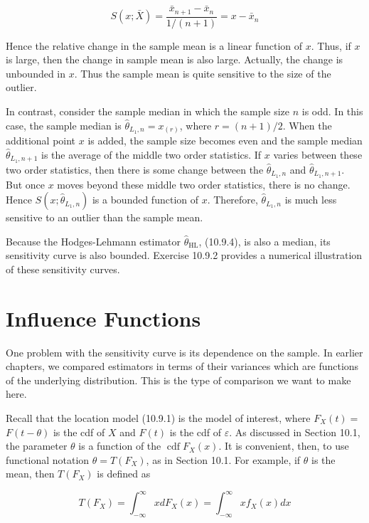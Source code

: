 \begin{equation*}
S(x ; \bar{X})=\frac{\bar{x}_{n+1}-\bar{x}_{n}}{1 /(n+1)}=x-\bar{x}_{n} \tag{10.9.6}
\end{equation*}


Hence the relative change in the sample mean is a linear function of $x$. Thus, if $x$ is large, then the change in sample mean is also large. Actually, the change is unbounded in $x$. Thus the sample mean is quite sensitive to the size of the outlier.

In contrast, consider the sample median in which the sample size $n$ is odd. In this case, the sample median is $\widehat{\theta}_{L_{1}, n}=x_{(r)}$, where $r=(n+1) / 2$. When the additional point $x$ is added, the sample size becomes even and the sample median $\widehat{\theta}_{L_{1}, n+1}$ is the average of the middle two order statistics. If $x$ varies between these two order statistics, then there is some change between the $\widehat{\theta}_{L_{1}, n}$ and $\widehat{\theta}_{L_{1}, n+1}$. But once $x$ moves beyond these middle two order statistics, there is no change. Hence $S\left(x ; \widehat{\theta}_{L_{1}, n}\right)$ is a bounded function of $x$. Therefore, $\widehat{\theta}_{L_{1}, n}$ is much less sensitive to an outlier than the sample mean.

Because the Hodges-Lehmann estimator $\widehat{\theta}_{\mathrm{HL}}$, (10.9.4), is also a median, its sensitivity curve is also bounded. Exercise 10.9.2 provides a numerical illustration of these sensitivity curves.

\section*{Influence Functions}
One problem with the sensitivity curve is its dependence on the sample. In earlier chapters, we compared estimators in terms of their variances which are functions of the underlying distribution. This is the type of comparison we want to make here.

Recall that the location model (10.9.1) is the model of interest, where $F_{X}(t)=$ $F(t-\theta)$ is the cdf of $X$ and $F(t)$ is the cdf of $\varepsilon$. As discussed in Section 10.1, the parameter $\theta$ is a function of the $\operatorname{cdf} F_{X}(x)$. It is convenient, then, to use functional notation $\theta=T\left(F_{X}\right)$, as in Section 10.1. For example, if $\theta$ is the mean, then $T\left(F_{X}\right)$ is defined as


\begin{equation*}
T\left(F_{X}\right)=\int_{-\infty}^{\infty} x d F_{X}(x)=\int_{-\infty}^{\infty} x f_{X}(x) d x \tag{10.9.7}
\end{equation*}


